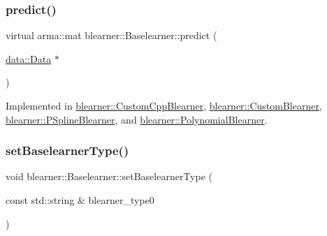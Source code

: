 \subsubsection{\texorpdfstring{predict()}{predict()}\hspace{0.1cm}{\footnotesize\ttfamily [2/2]}}
{\footnotesize\ttfamily virtual arma\+::mat blearner\+::\+Baselearner\+::predict (\begin{DoxyParamCaption}\item[{\mbox{\hyperlink{classdata_1_1_data}{data\+::\+Data}} $\ast$}]{ }\end{DoxyParamCaption})\hspace{0.3cm}{\ttfamily [pure virtual]}}



Implemented in \mbox{\hyperlink{classblearner_1_1_custom_cpp_blearner_af2326171640e94c3a00f813781710208}{blearner\+::\+Custom\+Cpp\+Blearner}}, \mbox{\hyperlink{classblearner_1_1_custom_blearner_a401a479834eb3896260cb57b4551ceb4}{blearner\+::\+Custom\+Blearner}}, \mbox{\hyperlink{classblearner_1_1_p_spline_blearner_a9d35aeb36c403c167fb7519379825873}{blearner\+::\+P\+Spline\+Blearner}}, and \mbox{\hyperlink{classblearner_1_1_polynomial_blearner_ae321c17adaab23b0d27685920c2608af}{blearner\+::\+Polynomial\+Blearner}}.

\mbox{\label{classblearner_1_1_baselearner_a8d78e851bae5f5b93dc46eb13d2d1ee1}} 
\subsubsection{\texorpdfstring{set\+Baselearner\+Type()}{setBaselearnerType()}}
{\footnotesize\ttfamily void blearner\+::\+Baselearner\+::set\+Baselearner\+Type (\begin{DoxyParamCaption}\item[{const std\+::string \&}]{blearner\+\_\+type0 }\end{DoxyParamCaption})}

